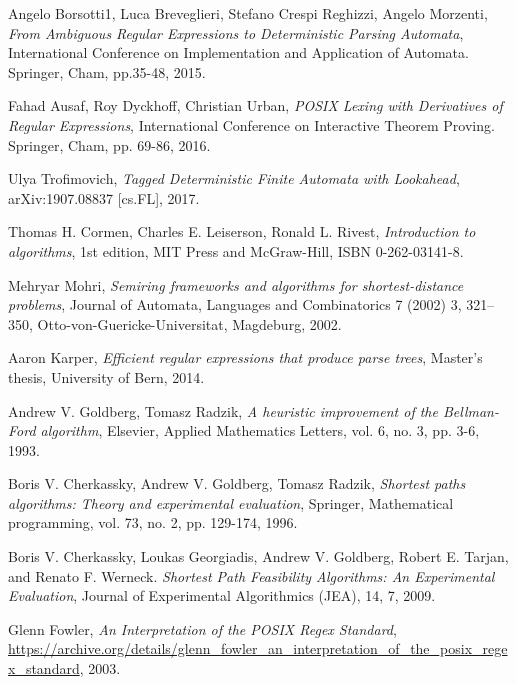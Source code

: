 \documentclass[AMA,STIX1COL]{WileyNJD-v2}
\begin{document}
\begin{thebibliography}{99}
    Angelo Borsotti1, Luca Breveglieri, Stefano Crespi Reghizzi, Angelo Morzenti,
    \textit{From Ambiguous Regular Expressions to Deterministic Parsing Automata},
    International Conference on Implementation and Application of Automata. Springer, Cham, pp.35-48,
    2015.

    Fahad Ausaf, Roy Dyckhoff, Christian Urban,
    \textit{POSIX Lexing with Derivatives of Regular Expressions},
    International Conference on Interactive Theorem Proving. Springer, Cham, pp. 69-86,
    2016.

    Ulya Trofimovich,
    \textit{Tagged Deterministic Finite Automata with Lookahead},
    arXiv:1907.08837 [cs.FL],
    2017.

    Thomas H. Cormen, Charles E. Leiserson, Ronald L. Rivest,
    \textit{Introduction to algorithms},
    1st edition,
    MIT Press and McGraw-Hill,
    ISBN 0-262-03141-8.

    Mehryar Mohri,
    \textit{Semiring frameworks and algorithms for shortest-distance problems},
    Journal of Automata, Languages and Combinatorics 7 (2002) 3, 321–350, Otto-von-Guericke-Universitat, Magdeburg,
    2002.

    Aaron Karper,
    \textit{Efficient regular expressions that produce parse trees},
    Master's thesis,
    University of Bern,
    2014.

    Andrew V. Goldberg, Tomasz Radzik,
    \textit{A heuristic improvement of the Bellman-Ford algorithm},
    Elsevier, Applied Mathematics Letters, vol. 6, no. 3, pp. 3-6,
    1993.

    Boris V. Cherkassky, Andrew V. Goldberg, Tomasz Radzik,
    \textit{Shortest paths algorithms: Theory and experimental evaluation},
    Springer, Mathematical programming, vol. 73, no. 2, pp. 129-174,
    1996.

    Boris V. Cherkassky, Loukas Georgiadis, Andrew V. Goldberg, Robert E. Tarjan, and Renato F. Werneck.
    \textit{Shortest Path Feasibility Algorithms: An Experimental Evaluation},
    Journal of Experimental Algorithmics (JEA), 14, 7,
    2009.

    Glenn Fowler,
    \textit{An Interpretation of the POSIX Regex Standard},
    \url{https://archive.org/details/glenn_fowler_an_interpretation_of_the_posix_regex_standard},
    2003.


\end{thebibliography}
\end{document}
